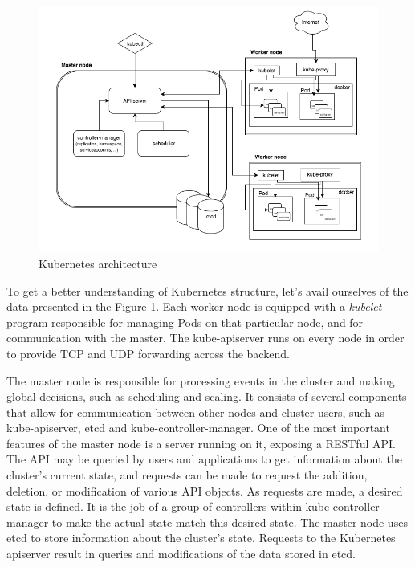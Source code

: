 \begin{figure}[!ht]
    \centering
    \includegraphics[width=1\textwidth, angle=0]{img/architecture.png}
    \caption{Kubernetes architecture~\cite{arch}}
    \label{fig:arch}
\end{figure}

To get a better understanding of Kubernetes structure, let’s avail ourselves of the data presented
in the Figure \ref{fig:arch}. Each worker node is equipped with a \textit{kubelet} program
responsible for managing Pods on that particular node, and for communication with the master. The
kube-apiserver runs on every node in order to provide TCP and UDP forwarding across the backend.

The master node is responsible for processing events in the cluster and making global decisions,
such as scheduling and scaling. It consists of several components that allow for communication
between other nodes and cluster users, such as kube-apiserver, etcd and kube-controller-manager.
One of the most important features of the master node is a server running on it, exposing a RESTful
API. The API may be queried by users and applications to get information about the cluster’s current
state, and requests can be made to request the addition, deletion, or modification of various API
objects. As requests are made, a desired state is defined. It is the job of a group of controllers
within kube-controller-manager to make the actual state match this desired state. The master node
uses etcd to store information about the cluster’s state. Requests to the Kubernetes apiserver
result in queries and modifications of the data stored in etcd.

